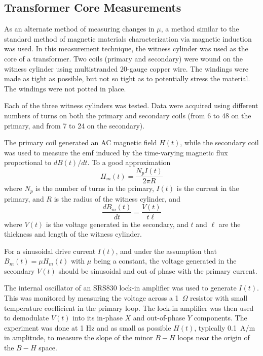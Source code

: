 
\subsection{Transformer Core Measurements}
\label{sec:transformer}

As an alternate method of measuring changes in $\mu$, a method similar
to the standard method of magnetic materials characterization via
magnetic induction was used.  In this measurement technique, the
witness cylinder was used as the core of a transformer.  Two coils
(primary and secondary) were wound on the witness cylinder using
multistranded 20-gauge copper wire.  The windings were made as tight
as possible, but not so tight as to potentially stress the material.
The windings were not potted in place.

Each of the three witness cylinders was tested.  Data were acquired
using different numbers of turns on both the primary and secondary
coils (from 6 to 48 on the primary, and from 7 to 24 on the
secondary).



The primary coil generated an AC magnetic field $H(t)$, while the
secondary coil was used to measure the emf induced by the time-varying
magnetic flux proportional to $dB(t)/dt$.  To a good
approximation
\begin{equation}
H_m(t)=\frac{N_pI(t)}{2\pi R}
\end{equation}
where $N_p$ is the number of turns in the primary, $I(t)$ is the
current in the primary, and $R$ is the radius of the witness cylinder,
and
\begin{equation}
\frac{dB_m(t)}{dt}=\frac{V(t)}{t\ell}
\end{equation}
where $V(t)$ is the voltage generated in the secondary, and $t$ and
$\ell$ are the thickness and length of the witness cylinder.

For a sinusoidal drive current $I(t)$, and under the assumption that
$B_m(t)=\mu H_m(t)$ with $\mu$ being a constant, the voltage generated
in the secondary $V(t)$ should be sinusoidal and out of phase with the
primary current.

The internal oscillator of an SRS830 lock-in amplifier was used to
generate $I(t)$.  This was monitored by measuring the voltage across a
1~$\Omega$ resistor with small temperature coefficient in the primary
loop.  The lock-in amplifier was then used to demodulate $V(t)$ into
its in-phase $X$ and out-of-phase $Y$ components.  The experiment was
done at 1 Hz and as small as possible $H(t)$, typically 0.1~A/m in
amplitude, to measure the slope of the minor $B-H$ loops near the
origin of the $B-H$ space.

